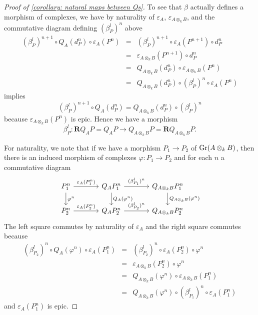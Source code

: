 \documentclass[dissertation.tex]{subfiles}
\begin{document}
\begin{proof}[Proof of {\ref{corollary: natural maps between Qs}}]
  To see that \(\beta\) actually defines a morphism of complexes, we have by naturality of \(\varepsilon_A\), \(\varepsilon_{A \otimes_k B}\), and the commutative diagram defining \((\beta^l_P)^n\) above 
  \begin{eqnarray*}
    (\beta^l_P)^{n+1} \circ Q_{A}(d^n_{P}) \circ \varepsilon_{A}(P^n)
    &=& (\beta^l_P)^{n+1} \circ \varepsilon_{A}(P^{n+1}) \circ d^n_{P}\\
    &=& \varepsilon_{A \otimes_k B}(P^{n+1}) \circ d^n_{P}\\
    &=& Q_{A \otimes_k B}(d_{P}^n) \circ \varepsilon_{A \otimes_k B}(P^n)\\
    &=& Q_{A \otimes_k B}(d_{P}^n) \circ (\beta^l_P)^n \circ \varepsilon_{A}(P^n)
  \end{eqnarray*}
  implies
  \[(\beta^l_P)^{n+1} \circ Q_{A}(d^n_{P}) = Q_{A \otimes_k B}(d^n_{P}) \circ (\beta^l_P)^n\]
  because \(\varepsilon_{A \otimes_k B}(P^n)\) is epic. Hence we have a morphism
  \[\beta^l_P \colon \mathbf{R}Q_{A} P = Q_{A} P \to Q_{A \otimes_k B} P = \mathbf{R}Q_{A \otimes_k B} P.\]

  For naturality, we note that if we have a morphism \(P_1 \to P_2\) of \(\operatorname{Gr}(A \otimes_k B)\), then there is an induced morphism of complexes \(\varphi \colon P_1 \to P_2\) and for each \(n\) a commutative diagram 
  \[\begin{tikzcd}[column sep=large]
  P_1^n \arrow{d}{\varphi^n}\arrow{r}{\varepsilon_{A}(P_1^n)} & Q_{A} P_1^n\arrow{d}{Q_{A}(\varphi^n)} \arrow{r}{(\beta^l_{P_1})^n} & Q_{A \otimes_k B}P_1^n \arrow{d}{Q_{A \otimes_k B}(\varphi^n)}\\
  P_2^n \arrow{r}{\varepsilon_{A}(P_2^n)} & Q_{A} P_2^n \arrow{r}{(\beta^l_{P_2})^n} & Q_{A \otimes_k B} P_2^n
  \end{tikzcd}\]  The left square commutes by naturality of \(\varepsilon_{A}\) and the right square commutes because
  \begin{eqnarray*}
    (\beta^l_{P_2})^n \circ Q_{A}(\varphi^n) \circ \varepsilon_{A}(P_1^n)
    &=& (\beta^l_{P_2})^n \circ \varepsilon_{A}(P_2^n) \circ \varphi^n\\
    &=&  \varepsilon_{A \otimes_k B}(P_2^n) \circ \varphi^n\\
    &=& Q_{A \otimes_k B}(\varphi^n) \circ \varepsilon_{A \otimes_k B}(P_1^n)\\
    &=& Q_{A \otimes_k B}(\varphi^n) \circ (\beta^l_{P_1})^n \circ \varepsilon_{A}(P_1^n)
  \end{eqnarray*}
  and \(\varepsilon_{A}(P_1^n)\) is epic.
\end{proof}
\end{document}
